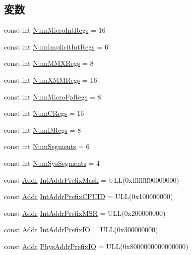 \subsection*{変数}
\begin{DoxyCompactItemize}
\item 
const int \hyperlink{namespaceX86ISA_a985912475a96ec00a4ff48b39004d43a}{NumMicroIntRegs} = 16
\item 
const int \hyperlink{namespaceX86ISA_a7e051dc96074ceadda53ac54735a2181}{NumImplicitIntRegs} = 6
\item 
const int \hyperlink{namespaceX86ISA_af6bd57cad3e7e95416c76157823cde61}{NumMMXRegs} = 8
\item 
const int \hyperlink{namespaceX86ISA_a4961e4eef414c898b4b4f69546f882f7}{NumXMMRegs} = 16
\item 
const int \hyperlink{namespaceX86ISA_aa4e351caf21c98a06534828e60df47fc}{NumMicroFpRegs} = 8
\item 
const int \hyperlink{namespaceX86ISA_aa7b00e7134e61bbf5bb84a64b1897ede}{NumCRegs} = 16
\item 
const int \hyperlink{namespaceX86ISA_ad71fd402e58f9dee6b8ded9632536fcd}{NumDRegs} = 8
\item 
const int \hyperlink{namespaceX86ISA_a0bb4140ad1f63c813ff9ca7ef9fc1381}{NumSegments} = 6
\item 
const int \hyperlink{namespaceX86ISA_adffcd07c42288f846041830051e26bd8}{NumSysSegments} = 4
\item 
const \hyperlink{base_2types_8hh_af1bb03d6a4ee096394a6749f0a169232}{Addr} \hyperlink{namespaceX86ISA_a62621fac9b93ee845449884ed6837442}{IntAddrPrefixMask} = ULL(0xffffffff00000000)
\item 
const \hyperlink{base_2types_8hh_af1bb03d6a4ee096394a6749f0a169232}{Addr} \hyperlink{namespaceX86ISA_a19b7531b77e7cc62c0f9fc6ef2d533ff}{IntAddrPrefixCPUID} = ULL(0x100000000)
\item 
const \hyperlink{base_2types_8hh_af1bb03d6a4ee096394a6749f0a169232}{Addr} \hyperlink{namespaceX86ISA_ad4c44000b725a32955ce5a71dd748d6c}{IntAddrPrefixMSR} = ULL(0x200000000)
\item 
const \hyperlink{base_2types_8hh_af1bb03d6a4ee096394a6749f0a169232}{Addr} \hyperlink{namespaceX86ISA_af68ed0db853c56ca0bc7d0761c54d275}{IntAddrPrefixIO} = ULL(0x300000000)
\item 
const \hyperlink{base_2types_8hh_af1bb03d6a4ee096394a6749f0a169232}{Addr} \hyperlink{namespaceX86ISA_a170b5c7d48662ed4dbde16baa5f663ca}{PhysAddrPrefixIO} = ULL(0x8000000000000000)
\item 

\end{DoxyCompactItemize}
